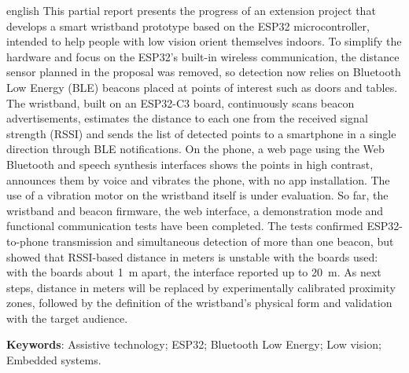 \begin{resumo}[Abstract]
\begin{otherlanguage*}{english}
This partial report presents the progress of an extension project that develops a smart wristband prototype based on the ESP32 microcontroller, intended to help people with low vision orient themselves indoors. To simplify the hardware and focus on the ESP32's built-in wireless communication, the distance sensor planned in the proposal was removed, so detection now relies on Bluetooth Low Energy (BLE) beacons placed at points of interest such as doors and tables. The wristband, built on an ESP32-C3 board, continuously scans beacon advertisements, estimates the distance to each one from the received signal strength (RSSI) and sends the list of detected points to a smartphone in a single direction through BLE notifications. On the phone, a web page using the Web Bluetooth and speech synthesis interfaces shows the points in high contrast, announces them by voice and vibrates the phone, with no app installation. The use of a vibration motor on the wristband itself is under evaluation. So far, the wristband and beacon firmware, the web interface, a demonstration mode and functional communication tests have been completed. The tests confirmed ESP32-to-phone transmission and simultaneous detection of more than one beacon, but showed that RSSI-based distance in meters is unstable with the boards used: with the boards about 1~m apart, the interface reported up to 20~m. As next steps, distance in meters will be replaced by experimentally calibrated proximity zones, followed by the definition of the wristband's physical form and validation with the target audience.

\vspace{\onelineskip}
\noindent
\textbf{Keywords}: Assistive technology; ESP32; Bluetooth Low Energy; Low vision; Embedded systems.
\end{otherlanguage*}
\end{resumo}
